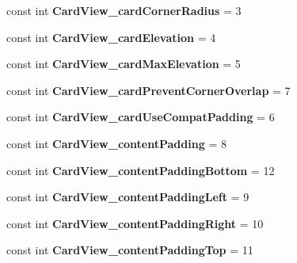 \begin{DoxyCompactItemize}
const int {\bfseries Card\+View\+\_\+card\+Corner\+Radius} = 3
\item 
\mbox{\label{classXaria_1_1Resource_1_1Styleable_a4c36d05750c042ecc377db593ba800bd}} 
const int {\bfseries Card\+View\+\_\+card\+Elevation} = 4
\item 
\mbox{\label{classXaria_1_1Resource_1_1Styleable_a51039ea4b68ff31f7e9bb57dbec4bce5}} 
const int {\bfseries Card\+View\+\_\+card\+Max\+Elevation} = 5
\item 
\mbox{\label{classXaria_1_1Resource_1_1Styleable_a0763e4c0d7e9815539dcd88b3ba5eaa3}} 
const int {\bfseries Card\+View\+\_\+card\+Prevent\+Corner\+Overlap} = 7
\item 
\mbox{\label{classXaria_1_1Resource_1_1Styleable_a4e1e01e77a2499eedf689c1ac654ca77}} 
const int {\bfseries Card\+View\+\_\+card\+Use\+Compat\+Padding} = 6
\item 
\mbox{\label{classXaria_1_1Resource_1_1Styleable_ad4df5f000287bfd5b19b2777d71136dd}} 
const int {\bfseries Card\+View\+\_\+content\+Padding} = 8
\item 
\mbox{\label{classXaria_1_1Resource_1_1Styleable_aea02d7683c940f643abcca9f1d4a8ad1}} 
const int {\bfseries Card\+View\+\_\+content\+Padding\+Bottom} = 12
\item 
\mbox{\label{classXaria_1_1Resource_1_1Styleable_a7c88174f0ba42315ab6a9e43acc54e42}} 
const int {\bfseries Card\+View\+\_\+content\+Padding\+Left} = 9
\item 
\mbox{\label{classXaria_1_1Resource_1_1Styleable_a09a357969a50f9d0a2a7eb9e07068a3e}} 
const int {\bfseries Card\+View\+\_\+content\+Padding\+Right} = 10
\item 
\mbox{\label{classXaria_1_1Resource_1_1Styleable_af144d0f4fb9faf5a017f0db2657fcbef}} 
const int {\bfseries Card\+View\+\_\+content\+Padding\+Top} = 11
\item 

\end{DoxyCompactItemize}
